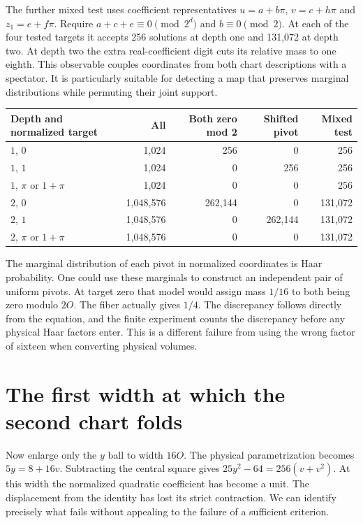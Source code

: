 \documentclass[12pt,letterpaper]{article}
\begin{document}
The further mixed test uses coefficient representatives $u=a+b\pi$, $v=c+h\pi$ and $z_1=e+f\pi$. Require $a+c+e\equiv0\pmod{2^d}$ and $b\equiv0\pmod2$. At each of the four tested targets it accepts 256 solutions at depth one and 131,072 at depth two. At depth two the extra real-coefficient digit cuts its relative mass to one eighth. This observable couples coordinates from both chart descriptions with a spectator. It is particularly suitable for detecting a map that preserves marginal distributions while permuting their joint support.

\begin{center}\small\begin{tabular}{@{}lrrrr@{}}\toprule
Depth and normalized target & All & Both zero mod 2 & Shifted pivot & Mixed test\\\midrule
$1$, $0$ & 1,024 & 256 & 0 & 256\\
$1$, $1$ & 1,024 & 0 & 256 & 256\\
$1$, $\pi$ or $1+\pi$ & 1,024 & 0 & 0 & 256\\
$2$, $0$ & 1,048,576 & 262,144 & 0 & 131,072\\
$2$, $1$ & 1,048,576 & 0 & 262,144 & 131,072\\
$2$, $\pi$ or $1+\pi$ & 1,048,576 & 0 & 0 & 131,072\\\bottomrule
\end{tabular}\end{center}
The marginal distribution of each pivot in normalized coordinates is Haar probability. One could use these marginals to construct an independent pair of uniform pivots. At target zero that model would assign mass $1/16$ to both being zero modulo $2O$. The fiber actually gives $1/4$. The discrepancy follows directly from the equation, and the finite experiment counts the discrepancy before any physical Haar factors enter. This is a different failure from using the wrong factor of sixteen when converting physical volumes.

\section{The first width at which the second chart folds}
Now enlarge only the $y$ ball to width $16O$. The physical parametrization becomes $5y=8+16v$. Subtracting the central square gives $25y^2-64=256(v+v^2)$. At this width the normalized quadratic coefficient has become a unit. The displacement from the identity has lost its strict contraction. We can identify precisely what fails without appealing to the failure of a sufficient criterion.
\end{document}
